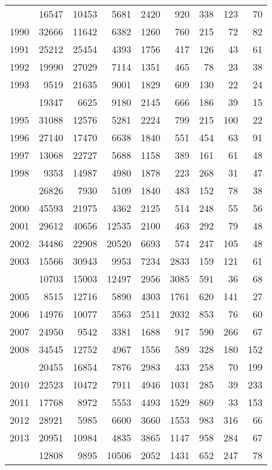 \documentclass[
]{article}
\begin{document}
\begin{longtable}[t]{lrrrrrrrr}
\endfoot
\bottomrule
\endlastfoot
1989 & 16547 & 10453 & 5681 & 2420 & 920 & 338 & 123 & 70\\
1990 & 32666 & 11642 & 6382 & 1260 & 760 & 215 & 72 & 82\\
1991 & 25212 & 25454 & 4393 & 1756 & 417 & 126 & 43 & 61\\
1992 & 19990 & 27029 & 7114 & 1351 & 465 & 78 & 23 & 38\\
1993 & 9519 & 21635 & 9001 & 1829 & 609 & 130 & 22 & 24\\
\addlinespace
1994 & 19347 & 6625 & 9180 & 2145 & 666 & 186 & 39 & 15\\
1995 & 31088 & 12576 & 5281 & 2224 & 799 & 215 & 100 & 22\\
1996 & 27140 & 17470 & 6638 & 1840 & 551 & 454 & 63 & 91\\
1997 & 13068 & 22727 & 5688 & 1158 & 389 & 161 & 61 & 48\\
1998 & 9353 & 14987 & 4980 & 1878 & 223 & 268 & 31 & 47\\
\addlinespace
1999 & 26826 & 7930 & 5109 & 1840 & 483 & 152 & 78 & 38\\
2000 & 45593 & 21975 & 4362 & 2125 & 514 & 248 & 55 & 56\\
2001 & 29612 & 40656 & 12535 & 2100 & 463 & 292 & 79 & 48\\
2002 & 34486 & 22908 & 20520 & 6693 & 574 & 247 & 105 & 48\\
2003 & 15566 & 30943 & 9953 & 7234 & 2833 & 159 & 121 & 61\\
\addlinespace
2004 & 10703 & 15003 & 12497 & 2956 & 3085 & 591 & 36 & 68\\
2005 & 8515 & 12716 & 5890 & 4303 & 1761 & 620 & 141 & 27\\
2006 & 14976 & 10077 & 3563 & 2511 & 2032 & 853 & 76 & 60\\
2007 & 24950 & 9542 & 3381 & 1688 & 917 & 590 & 266 & 67\\
2008 & 34545 & 12752 & 4967 & 1556 & 589 & 328 & 180 & 152\\
\addlinespace
2009 & 20455 & 16854 & 7876 & 2983 & 433 & 258 & 70 & 199\\
2010 & 22523 & 10472 & 7911 & 4946 & 1031 & 285 & 39 & 233\\
2011 & 17768 & 8972 & 5553 & 4493 & 1529 & 869 & 33 & 153\\
2012 & 28921 & 5985 & 6600 & 3660 & 1553 & 983 & 316 & 66\\
2013 & 20951 & 10984 & 4835 & 3865 & 1147 & 958 & 284 & 67\\
\addlinespace
2014 & 12808 & 9895 & 10506 & 2052 & 1431 & 652 & 247 & 78\\

\end{longtable}
\end{document}
